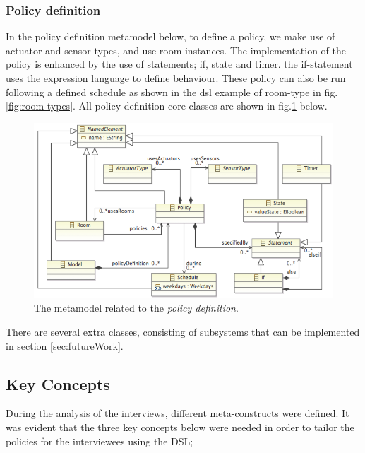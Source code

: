 \subsubsection{Policy definition}
In the policy definition metamodel below, to define a policy, we make use of actuator and sensor types, and use room instances. The implementation of the policy is enhanced by the use of statements; if, state and timer. the if-statement uses the expression language to define behaviour. These policy can also be run following a defined schedule as shown in the dsl example of room-type in fig.\ref{fig:room-types}. All policy definition core classes are shown in fig.\ref{fig:ecore-policy-definition} below.
\begin{figure}[h]
  \centering
    \includegraphics[scale=.5]{ecore-policy-definition.png}	
	\caption{The metamodel related to the \textit{policy definition}.}
	\label{fig:ecore-policy-definition}
\end{figure}

There are several extra classes, consisting of subsystems that can be implemented in section \ref{sec:futureWork}.

\subsection{Key Concepts}

During the analysis of the interviews, different meta-constructs were defined. It was evident that the three key concepts below were needed in order to tailor the policies for the interviewees using the DSL;

